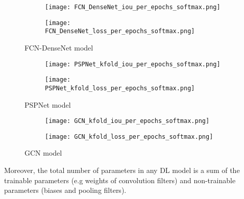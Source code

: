 \begin{figure}[!h]
	\begin{subfigure}[b]{0.47\textwidth}
	\centering
	\texttt{[image: FCN\_DenseNet\_iou\_per\_epochs\_softmax.png]}
	\caption{}
	\label{fig:fcn_densenet_accuracy_metric}
	\end{subfigure}
	\hfill
	\begin{subfigure}[b]{0.47\textwidth}
	\centering
	\texttt{[image: FCN\_DenseNet\_loss\_per\_epochs\_softmax.png]}
	\caption{}
	\label{fig:fcn_densenet_loss_metric}
	\end{subfigure}	
\caption{FCN-DenseNet model}
\label{fig:FCN_DenseNet_iou_loss}
\end{figure}
\begin{figure} [!h]
	\centering
	\begin{subfigure}[b]{0.47\textwidth}
		\centering
		\texttt{[image: PSPNet\_kfold\_iou\_per\_epochs\_softmax.png]}
		\caption{}
		\label{fig:psp_accuracy_metric}
	\end{subfigure}
	\hfill
	\begin{subfigure}[b]{0.47\textwidth}
		\centering
		\texttt{[image: PSPNet\_kfold\_loss\_per\_epochs\_softmax.png]}
	\caption{}
	\label{fig:psp_loss_metric}
	\end{subfigure}
	\caption{PSPNet model}
	\label{fig:PSPNet_iou_loss}
\end{figure}
\begin{figure} [!h]
	\centering
	\begin{subfigure}[b]{0.47\textwidth}
		\centering
		\texttt{[image: GCN\_kfold\_iou\_per\_epochs\_softmax.png]}
		\caption{}
		\label{fig:gcn_accuracy_metric}
	\end{subfigure}
	\hfill
	\begin{subfigure}[b]{0.47\textwidth}
		\centering
		\texttt{[image: GCN\_kfold\_loss\_per\_epochs\_softmax.png]}			
		\caption{}
		\label{fig:gcn_loss_metric}
	\end{subfigure}
	\caption{GCN model}
	\label{fig:GCN_iou_loss}	
\end{figure}
Moreover, the total number of parameters in any DL model is a sum of the trainable parameters (e.g weights of convolution filters) and non-trainable parameters (biases and pooling filters).
